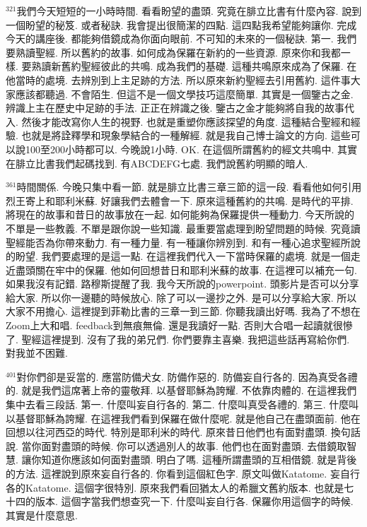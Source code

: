 \documentclass{book}
\begin{document}
$^{321}$我們今天短短的一小時時間.
看看盼望的盡頭.
究竟在腓立比書有什麼內容.
說到一個盼望的秘笈.
或者秘訣.
我會提出很簡潔的四點.
這四點我希望能夠讓你.
完成今天的講座後.
都能夠借鏡成為你面向眼前.
不可知的未來的一個秘訣.
第一.
我們要熟讀聖經.
所以舊約的故事.
如何成為保羅在新約的一些資源.
原來你和我都一樣.
要熟讀新舊約聖經彼此的共鳴.
成為我們的基礎.
這種共鳴原來成為了保羅.
在他當時的處境.
去辨別到上主足跡的方法.
所以原來新約聖經去引用舊約.
這件事大家應該都聽過.
不會陌生.
但這不是一個文學技巧這麼簡單.
其實是一個鑒古之金.
辨識上主在歷史中足跡的手法.
正正在辨識之後.
鑒古之金才能夠將自我的故事代入.
然後才能改寫你人生的視野.
也就是重塑你應該探望的角度.
這種結合聖經和經驗.
也就是將詮釋學和現象學結合的一種解經.
就是我自己博士論文的方向.
這些可以說100至200小時都可以.
今晚說1小時.
OK.
在這個所謂舊約的經文共鳴中.
其實在腓立比書我們起碼找到.
有ABCDEFG七處.
我們說舊約明顯的暗人.

$^{361}$時間關係.
今晚只集中看一節.
就是腓立比書三章三節的這一段.
看看他如何引用烈王寄上和耶利米蘇.
好讓我們去體會一下.
原來這種舊約的共鳴.
是時代的平排.
將現在的故事和昔日的故事放在一起.
如何能夠為保羅提供一種動力.
今天所說的不單是一些教義.
不單是跟你說一些知識.
最重要當處理到盼望問題的時候.
究竟讀聖經能否為你帶來動力.
有一種力量.
有一種讓你辨別到.
和有一種心追求聖經所說的盼望.
我們要處理的是這一點.
在這裡我們代入一下當時保羅的處境.
就是一個走近盡頭關在牢中的保羅.
他如何回想昔日和耶利米蘇的故事.
在這裡可以補充一句.
如果我沒有記錯.
路穆斯提醒了我.
我今天所說的powerpoint.
頭影片是否可以分享給大家.
所以你一邊聽的時候放心.
除了可以一邊抄之外.
是可以分享給大家.
所以大家不用擔心.
這裡提到菲勒比書的三章一到三節.
你聽我讀出好嗎.
我為了不想在Zoom上大和唱.
feedback到無痕無倫.
還是我讀好一點.
否則大合唱一起讀就很慘了.
聖經這裡提到.
沒有了我的弟兄們.
你們要靠主喜樂.
我把這些話再寫給你們.
對我並不困難.

$^{401}$對你們卻是妥當的.
應當防備犬女.
防備作惡的.
防備妄自行各的.
因為真受各禮的.
就是我們這席著上帝的靈敬拜.
以基督耶穌為誇耀.
不依靠肉體的.
在這裡我們集中去看三段話.
第一.
什麼叫妄自行各的.
第二.
什麼叫真受各禮的.
第三.
什麼叫以基督耶穌為誇耀.
在這裡我們看到保羅在做什麼呢.
就是他自己在盡頭面前.
他在回想以往河西亞的時代.
特別是耶利米的時代.
原來昔日他們也有面對盡頭.
換句話說.
當你面對盡頭的時候.
你可以透過別人的故事.
他們也在面對盡頭.
去借鏡取智慧.
讓你知道你應該如何面對盡頭.
明白了嗎.
這種所謂盡頭的互相借鏡.
就是背後的方法.
這裡說到原來妄自行各的.
你看到這個紅色字.
原文叫做Katatome.
妄自行各的Katatome.
這個字很特別.
原來我們看回猶太人的希臘文舊約版本.
也就是七十四的版本.
這個字當我們想查究一下.
什麼叫妄自行各.
保羅你用這個字的時候.
其實是什麼意思.
\end{document}

